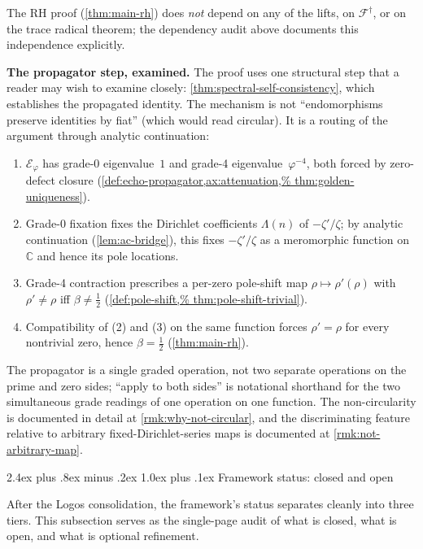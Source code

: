 \documentclass[11pt,a4paper]{article}
\makeatletter
\theoremstyle{plain}
\theoremstyle{definition}
\theoremstyle{remark}
\numberwithin{equation}{section}
\newcommand{\vp}{\varphi}
\renewcommand{\subsection}{%
  \@startsection{subsection}{2}{0pt}%
    {2.4ex plus .8ex minus .2ex}%
    {1.0ex plus .1ex}%
    {\normalfont\Large\bfseries\color{headingAccent}}%
}
\makeatother
\begin{document}
The RH proof (\cref{thm:main-rh}) does \emph{not} depend on any of
the lifts, on $\mathcal{F}^{\dagger}$, or on the trace radical
theorem; the dependency audit above documents this independence
explicitly.

\medskip\noindent\textbf{The propagator step, examined.}
The proof uses one structural step that a reader may wish to examine
closely: \cref{thm:spectral-self-consistency}, which establishes the
propagated identity.  The mechanism is not ``endomorphisms preserve
identities by fiat'' (which would read circular).  It is a routing
of the argument through analytic continuation:
\begin{enumerate}
  \item \(\mathcal{E}_\vp\) has grade-0 eigenvalue~\(1\) and
    grade-4 eigenvalue~\(\vp^{-4}\), both forced by zero-defect
    closure (\cref{def:echo-propagator,ax:attenuation,%
    thm:golden-uniqueness}).
  \item Grade-0 fixation fixes the Dirichlet coefficients
    \(\Lambda(n)\) of \(-\zeta'/\zeta\); by analytic continuation
    (\cref{lem:ac-bridge}), this fixes \(-\zeta'/\zeta\) as a
    meromorphic function on \(\mathbb{C}\) and hence its pole
    locations.
  \item Grade-4 contraction prescribes a per-zero pole-shift map
    \(\rho\mapsto\rho'(\rho)\) with \(\rho'\ne\rho\) iff
    \(\beta\ne\tfrac12\) (\cref{def:pole-shift,%
    thm:pole-shift-trivial}).
  \item Compatibility of (2) and (3) on the same function forces
    \(\rho'=\rho\) for every nontrivial zero, hence
    \(\beta=\tfrac12\) (\cref{thm:main-rh}).
\end{enumerate}
The propagator is a single graded operation, not two separate
operations on the prime and zero sides; ``apply to both sides'' is
notational shorthand for the two simultaneous grade readings of
one operation on one function.  The non-circularity is documented
in detail at \cref{rmk:why-not-circular}, and the discriminating
feature relative to arbitrary fixed-Dirichlet-series maps is
documented at \cref{rmk:not-arbitrary-map}.

\subsection{Framework status: closed and open}
\label{subsec:framework-status}

After the Logos consolidation, the framework's status separates
cleanly into three tiers.  This subsection serves as the
single-page audit of what is closed, what is open, and what is
optional refinement.
\end{document}
